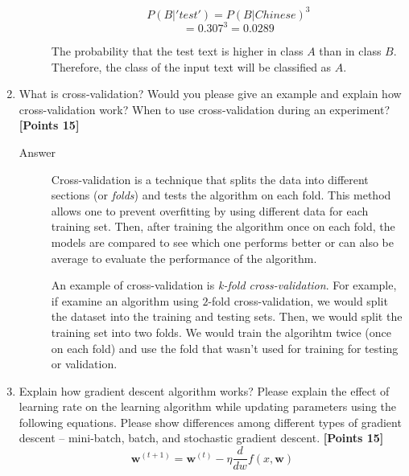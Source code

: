 \documentclass[12pt]{article}
\begin{document}
\begin{enumerate}
\begin{description}
                  \begin{equation}
                      P(B|'test') = P(B|Chinese)^3
                  \end{equation}
                  \begin{equation*}
                      = 0.307^3 = 0.0289
                  \end{equation*}

                  The probability that the test text is higher in class $A$ than
                  in class $B$. Therefore, the class of the input text will be
                  classified as $A$.
          \end{description}
    \item What is cross-validation? Would you please give an example and explain
          how cross-validation work? When to use cross-validation during an
          experiment? \textbf{[Points 15]}
          \begin{description}
              \item[Answer] Cross-validation is a technique that splits the data
                  into different sections (or \textit{folds}) and tests the
                  algorithm on each fold. This method allows one to prevent
                  overfitting by using different data for each training set.
                  Then, after training the algorithm once on each fold, the
                  models are compared to see which one performs better or can
                  also be average to evaluate the performance of the algorithm.

                  An example of cross-validation is \textit{k-fold
                      cross-validation}. For example, if examine an algorithm
                  using $2$-fold cross-validation, we would split the
                  dataset into the training and testing sets. Then, we would
                  split the training set into two folds. We would train the
                  algorihtm twice (once on each fold) and use the fold that
                  wasn't used for training for testing or validation.
          \end{description}
    \item Explain how gradient descent algorithm works? Please explain the
          effect of learning rate on the learning algorithm while updating
          parameters using the following equations. Please show differences
          among different types of gradient descent – mini-batch, batch, and
          stochastic gradient descent. \textbf{[Points 15]}
          \begin{equation}
              \textbf{w}^{(t+1)} = \textbf{w}^{(t)} - \eta\frac{d}{dw}f(x,\textbf{w})
          \end{equation}


\end{enumerate}
\end{document}
